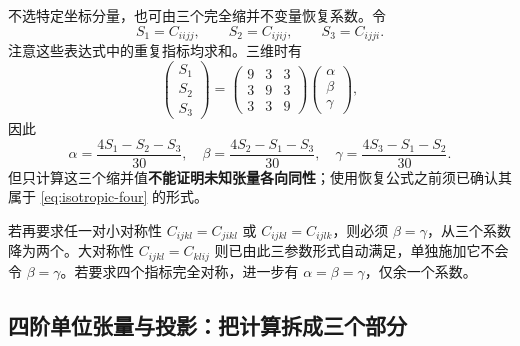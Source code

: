 不选特定坐标分量，也可由三个完全缩并不变量恢复系数。令
\begin{equation}
 S_1=C_{iijj},\qquad S_2=C_{ijij},\qquad S_3=C_{ijji}.
\end{equation}
注意这些表达式中的重复指标均求和。三维时有
\begin{equation}
 \begin{pmatrix}S_1\\S_2\\S_3\end{pmatrix}
 =\begin{pmatrix}9&3&3\\3&9&3\\3&3&9\end{pmatrix}
 \begin{pmatrix}\alpha\\\beta\\\gamma\end{pmatrix},
\end{equation}
因此
\begin{equation}
 \alpha=\frac{4S_1-S_2-S_3}{30},\quad
 \beta=\frac{4S_2-S_1-S_3}{30},\quad
 \gamma=\frac{4S_3-S_1-S_2}{30}.
\end{equation}
但只计算这三个缩并值\textbf{不能证明未知张量各向同性}；使用恢复公式之前须已确认其属于 \eqref{eq:isotropic-four} 的形式。

若再要求任一对小对称性 $C_{ijkl}=C_{jikl}$ 或 $C_{ijkl}=C_{ijlk}$，则必须 $\beta=\gamma$，从三个系数降为两个。大对称性 $C_{ijkl}=C_{klij}$ 则已由此三参数形式自动满足，单独施加它不会令 $\beta=\gamma$。若要求四个指标完全对称，进一步有 $\alpha=\beta=\gamma$，仅余一个系数。

\subsection{四阶单位张量与投影：把计算拆成三个部分}

